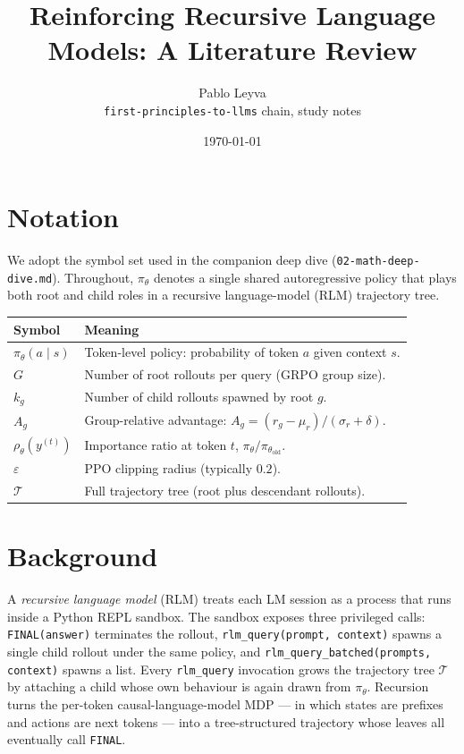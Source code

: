 \documentclass[11pt]{article}
\title{Reinforcing Recursive Language Models: A Literature Review}
\author{Pablo Leyva \\ \small \texttt{first-principles-to-llms} chain, study notes}
\date{\today}
\begin{document}
\maketitle

\section*{Notation}

We adopt the symbol set used in the companion deep dive
(\texttt{02-math-deep-dive.md}). Throughout, $\pi_\theta$ denotes a single shared
autoregressive policy that plays both root and child roles in a recursive
language-model (RLM) trajectory tree.

\begin{center}
\begin{tabular}{ll}
\hline
Symbol & Meaning \\
\hline
$\pi_\theta(a \mid s)$ & Token-level policy: probability of token $a$ given context $s$. \\
$G$                    & Number of root rollouts per query (GRPO group size). \\
$k_g$                  & Number of child rollouts spawned by root $g$. \\
$A_g$                  & Group-relative advantage: $A_g = (r_g - \mu_r)/(\sigma_r + \delta)$. \\
$\rho_\theta(y^{(t)})$ & Importance ratio at token $t$, $\pi_\theta / \pi_{\theta_{\text{old}}}$. \\
$\varepsilon$          & PPO clipping radius (typically $0.2$). \\
$\mathcal{T}$          & Full trajectory tree (root plus descendant rollouts). \\
\hline
\end{tabular}
\end{center}

\section*{Background}

A \emph{recursive language model} (RLM) \citep{zhang2026rlm} treats each LM
session as a process that runs inside a Python REPL sandbox. The sandbox exposes
three privileged calls: \texttt{FINAL(answer)} terminates the rollout,
\texttt{rlm\_query(prompt, context)} spawns a single child rollout under the
same policy, and \texttt{rlm\_query\_batched(prompts, context)} spawns a list.
Every \texttt{rlm\_query} invocation grows the trajectory tree $\mathcal{T}$ by
attaching a child whose own behaviour is again drawn from $\pi_\theta$.
Recursion turns the per-token causal-language-model MDP --- in which states are
prefixes and actions are next tokens \citep{schulman2017ppo} --- into a
tree-structured trajectory whose leaves all eventually call \texttt{FINAL}.
\end{document}
